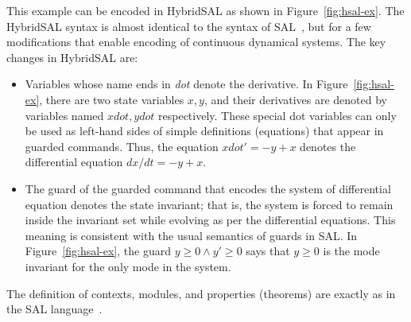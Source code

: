 \documentclass{article}
\begin{document}
This example can be encoded in HybridSAL as shown in
Figure~\ref{fig:hsal-ex}.  The HybridSAL syntax is 
almost identical to the syntax of SAL~\cite{sal}, but for a few
modifications that enable encoding of continuous dynamical
systems. The key changes in HybridSAL are:
\begin{itemize}
\item
Variables whose name ends in {\em{dot}} denote the derivative.
In Figure~\ref{fig:hsal-ex}, there are two state variables
$x,y$, and their derivatives are denoted by variables named
$xdot,ydot$ respectively.  These special dot variables can only
be used as left-hand sides of simple definitions (equations)
that appear in guarded commands.  Thus, the equation
$xdot' = -y+x$ denotes the differential equation
$dx/dt = -y+x$.
\item
The guard of the guarded command that encodes the system of
differential equation denotes the state invariant; that is,
the system is forced to remain inside the invariant set while
evolving as per the differential equations.
This meaning is consistent with the usual semantics of guards
in SAL. 
In Figure~\ref{fig:hsal-ex}, the guard $y \geq 0\wedge y'\geq 0$
says that $y\geq 0$ is the mode invariant for the only
mode in the system.
\end{itemize}
The definition of contexts, modules, and properties (theorems)
are exactly as in the SAL language~\cite{sal}.
\end{document}
